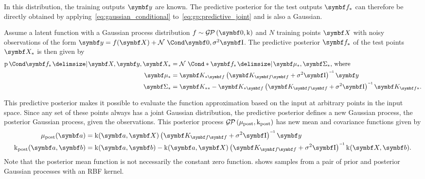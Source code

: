 In this distribution, the training outputs $\mat{y}$ are known.
The predictive posterior for the test outputs $\mat{f}_\ast$ can therefore be directly obtained by applying~\cref{eq:gaussian_conditional} to~\cref{eq:gp:predictive_joint} and is also a Gaussian.
\begin{lemma}
    \label{lem:gp:gp_posterior}
    Assume a latent function with a Gaussian process distribution $f \sim \GP(\mat{0}, \K)$ and $N$ training points $\mat{X}$ with noisy observations of the form $\mat{y} = f(\mat{X}) + \Gaussian{\mat{0}, \sigma^2 \Eye}$.
    The predictive posterior $\mat{f}_\ast$ of the test points $\mat{X}_\ast$ is then given by
    \begin{equation}
        \begin{split}
            \Prob{\mat{f}_\ast \given \mat{X}, \mat{y}, \mat{X}_\ast}
            &= \Gaussian*{\mat{f}_\ast \given \mat{\mu}_\ast, \mat{\Sigma}_\ast} \text{, where} \\
            \mat{\mu}_\ast
            &= \mat{K}_{\ast \mat{f}} \left( \mat{K}_{\mat{f}\mat{f}} + \sigma^2 \Eye \right)\inv \mat{y} \\
            \mat{\Sigma}_\ast
            &= \mat{K}_{\ast\ast} - \mat{K}_{\ast \mat{f}} \left( \mat{K}_{\mat{f}\mat{f}} + \sigma^2 \Eye \right)\inv \mat{K}_{\mat{f}\ast}.
        \end{split}
    \end{equation}
\end{lemma}

This predictive posterior makes it possible to evaluate the function approximation based on the input at arbitrary points in the input space.
Since any set of these points always has a joint Gaussian distribution, the predictive posterior defines a new Gaussian process, the posterior Gaussian process, given the observations.
This posterior process $\operatorname{\mathcal{G\mkern-1mu P}\mkern3mu}(\mu_\text{post}, \operatorname{k}_\text{post})$ has new mean and covariance functions given by
\begin{equation}
    \begin{split}
        \mu_\text{post}(\mat{a}) &= \K(\mat{a}, \mat{X}) \left(\mat{K}_{\mat{f}\mat{f}} + \sigma^2 \Eye \right)\inv \mat{y} \\
        \K_\text{post}(\mat{a}, \mat{b}) &= \K(\mat{a}, \mat{b}) - \K(\mat{a}, \mat{X}) \left( \mat{K}_{\mat{f}\mat{f}} + \sigma^2 \Eye \right)\inv \K(\mat{X}, \mat{b}).
    \end{split}
\end{equation}
Note that the posterior mean function is not necessarily the constant zero function.
 shows samples from a pair of prior and posterior Gaussian processes with an RBF kernel.

